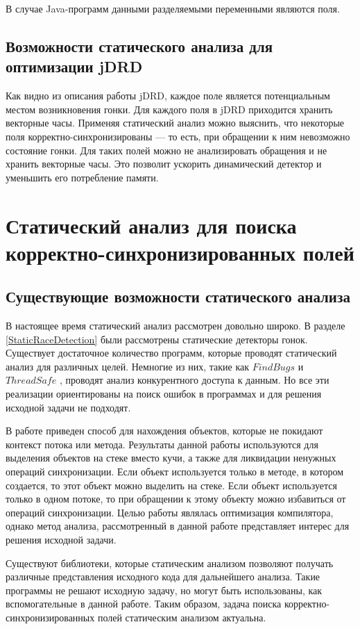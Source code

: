 В случае Java-программ данными разделяемыми переменными являются поля. 


\subsection{Возможности статического анализа для оптимизации jDRD}
Как видно из описания работы jDRD, каждое поле является потенциальным местом возникновения гонки.  
Для каждого поля в jDRD приходится хранить векторные часы. Применяя статический анализ можно выяснить, что некоторые поля корректно-синхронизированы --- то есть, при обращении к ним невозможно состояние гонки. Для таких полей можно не анализировать обращения и не хранить векторные часы. Это позволит ускорить динамический детектор и уменьшить его потребление памяти. 

\section{Статический анализ для поиска корректно-синхронизированных полей}

\subsection{Существующие возможности статического анализа}
В настоящее время статический анализ рассмотрен довольно широко.
В разделе \ref{StaticRaceDetection} были рассмотрены статические детекторы гонок. Существует достаточное количество программ, которые проводят статический анализ для различных целей. Немногие из них, такие как $FindBugs$ \cite{FindBugs} и $ThreadSafe$ \cite{ThreadSafe}, проводят анализ конкурентного доступа к данным. Но все эти реализации ориентированы на поиск ошибок в программах и для решения исходной задачи не подходят.

В работе \cite{Whaley:1999:CPE:320385.320400} приведен способ для нахождения объектов, которые не покидают контекст потока или метода. Результаты данной работы используются для выделения объектов на стеке вместо кучи, а также для ликвидации ненужных операций синхронизации.
 Если объект используется только в методе, в котором создается, то этот объект можно выделить на стеке. Если объект используется только в одном потоке, то при обращении к этому объекту можно избавиться от операций синхронизации. Целью работы являлась оптимизация компилятора, однако метод анализа, рассмотренный в данной работе представляет интерес для решения исходной задачи.

Существуют библиотеки, которые статическим анализом позволяют получать различные представления исходного кода для дальнейшего анализа. Такие программы не решают исходную задачу, но могут быть использованы, как вспомогательные в данной работе. 
Таким образом, задача поиска корректно-синхронизированных полей статическим анализом актуальна.
